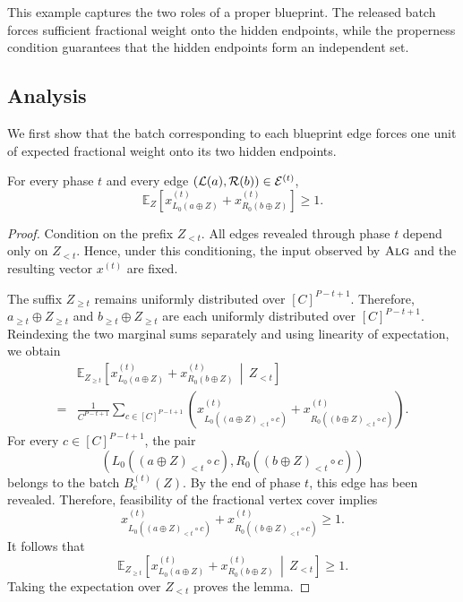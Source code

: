 This example captures the two roles of a proper blueprint. The released batch forces sufficient fractional weight onto the hidden endpoints, while the properness condition guarantees that the hidden endpoints form an independent set.

\subsection{Analysis}

We first show that the batch corresponding to each blueprint edge forces one unit of expected fractional weight onto its two hidden endpoints.

\begin{lemma}
\label{lem:expected-mass}
For every phase $t$ and every edge $(\mathcal{L}(a),\mathcal{R}(b))\in\mathcal{E}^{(t)}$,
$$
\mathbb{E}_Z
\left[
x^{(t)}_{L_0(a\oplus Z)}
+
x^{(t)}_{R_0(b\oplus Z)}
\right]
\geq 1.
$$
\end{lemma}

\begin{proof}
Condition on the prefix $Z_{<t}$. All edges revealed through phase $t$ depend only on $Z_{<t}$. Hence, under this conditioning, the input observed by $\textsc{Alg}$ and the resulting vector $x^{(t)}$ are fixed.

The suffix $Z_{\geq t}$ remains uniformly distributed over $[C]^{P-t+1}$. Therefore, $a_{\geq t}\oplus Z_{\geq t}$ and $b_{\geq t}\oplus Z_{\geq t}$ are each uniformly distributed over $[C]^{P-t+1}$. Reindexing the two marginal sums separately and using linearity of expectation, we obtain
\begin{align*}
    &\mathbb{E}_{Z_{\geq t}}
    \left[
        x^{(t)}_{L_0(a\oplus Z)}
        +
        x^{(t)}_{R_0(b\oplus Z)}
        \,\middle|\,
        Z_{<t}
    \right] \\
    ={}&
    \frac{1}{C^{P-t+1}}
    \sum_{c\in[C]^{P-t+1}}
    \left(
        x^{(t)}_{L_0((a\oplus Z)_{<t}\circ c)}
        +
        x^{(t)}_{R_0((b\oplus Z)_{<t}\circ c)}
    \right).
\end{align*}
For every $c\in[C]^{P-t+1}$, the pair
$$
\left(
    L_0((a\oplus Z)_{<t}\circ c),
    R_0((b\oplus Z)_{<t}\circ c)
\right)
$$
belongs to the batch $B_e^{(t)}(Z)$. By the end of phase $t$, this edge has been revealed. Therefore, feasibility of the fractional vertex cover implies
$$
x^{(t)}_{L_0((a\oplus Z)_{<t}\circ c)}
+
x^{(t)}_{R_0((b\oplus Z)_{<t}\circ c)}
\geq 1.
$$
It follows that
$$
\mathbb{E}_{Z_{\geq t}}
\left[
    x^{(t)}_{L_0(a\oplus Z)}
    +
    x^{(t)}_{R_0(b\oplus Z)}
    \,\middle|\,
    Z_{<t}
\right]
\geq 1.
$$
Taking the expectation over $Z_{<t}$ proves the lemma.
\end{proof}


